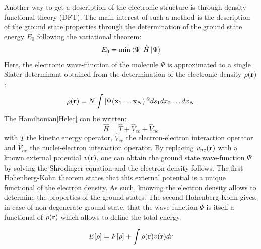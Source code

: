 \documentclass[12pt]{report}
\numberwithin{equation}{section}
\begin{document}
Another way to get a description of the electronic structure is through density functional theory (DFT).
The main interest of such a method is the description of the ground state properties through the determination of the ground state energy $E_0$ following the variational theorem:
\begin{equation}
    E_0 = \min \bra{\Psi} \hat{H} \ket{\Psi}
\end{equation}
Here, the electronic wave-function of the molecule $\Psi$ is approximated to a single Slater determinant obtained from the determination of the electronic density $\rho(\vb r)$:
\begin{equation}
    \rho(\vb r)=N\int |\Psi(\vb x_1 \ldots \vb x_N)|^2 ds_1 dx_2 \ldots dx_N
\end{equation}
The Hamiltonian\ref{Helec} can be written:
\begin{equation}\label{Hop}
    \hat{H}=\hat{T} + \hat{V}_{ee} + \hat{V}_{ne}
\end{equation} 
with $\hat{T}$ the kinetic energy operator, $\hat{V}_{ee}$ the electron-electron interaction operator and $\hat{V}_{ne}$ the nuclei-electron interaction operator. 
By replacing $v_{ne}(\vb r)$ with a known external potential $v(\vb r)$, one can obtain the ground state wave-function $\Psi$ by solving the Shrodinger equation and the electron density follows.
The first Hohenberg-Kohn theorem states that this external potential is a unique functional of the electron density\cite{hohenberg_inhomogeneous_1964}.
As such, knowing the electron density allows to determine the properties of the ground states.
The second Hohenberg-Kohn gives, in case of non degenerate ground state, that the wave-function $\Psi$ is itself a functional of $\rho(\vb r)$ which allows to define the total energy:

\begin{equation}\label{EnergyDFT}
    E[\rho]= F[\rho]+ \int \rho(\vb r) v(\vb r)dr
\end{equation}
\end{document}
